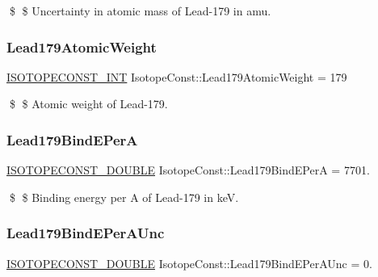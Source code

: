 \$ \$ Uncertainty in atomic mass of Lead-\/179 in amu. \mbox{\label{group___isotope_const-_lead-_pb179_ga4f81b4c1d332636ea05553b19a503086}} 
\subsubsection{\texorpdfstring{Lead179\+Atomic\+Weight}{Lead179AtomicWeight}}
{\footnotesize\ttfamily \mbox{\hyperlink{group___isotope_const-_macros_ga5f18360b3e99483a35c32d789e62621c}{I\+S\+O\+T\+O\+P\+E\+C\+O\+N\+S\+T\+\_\+\+I\+NT}} Isotope\+Const\+::\+Lead179\+Atomic\+Weight = 179}

\$ \$ Atomic weight of Lead-\/179. \mbox{\label{group___isotope_const-_lead-_pb179_ga4fbec604b3d1d8026578832482c9ffc2}} 
\subsubsection{\texorpdfstring{Lead179\+Bind\+E\+PerA}{Lead179BindEPerA}}
{\footnotesize\ttfamily \mbox{\hyperlink{group___isotope_const-_macros_ga8f45a7272ce02c0b4c65c44636ed719a}{I\+S\+O\+T\+O\+P\+E\+C\+O\+N\+S\+T\+\_\+\+D\+O\+U\+B\+LE}} Isotope\+Const\+::\+Lead179\+Bind\+E\+PerA = 7701.}

\$ \$ Binding energy per A of Lead-\/179 in keV. \mbox{\label{group___isotope_const-_lead-_pb179_ga5dd4b9c1c58ae7d189ecd9ee5c330c8a}} 
\subsubsection{\texorpdfstring{Lead179\+Bind\+E\+Per\+A\+Unc}{Lead179BindEPerAUnc}}
{\footnotesize\ttfamily \mbox{\hyperlink{group___isotope_const-_macros_ga8f45a7272ce02c0b4c65c44636ed719a}{I\+S\+O\+T\+O\+P\+E\+C\+O\+N\+S\+T\+\_\+\+D\+O\+U\+B\+LE}} Isotope\+Const\+::\+Lead179\+Bind\+E\+Per\+A\+Unc = 0.}

